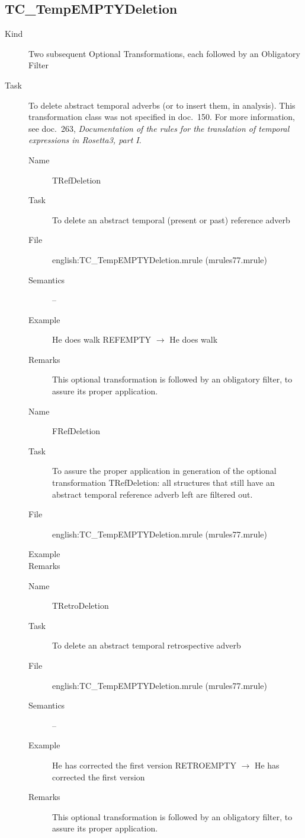 \newpage
\subsection{TC\_TempEMPTYDeletion}
\begin{description}
\item[Kind] Two subsequent Optional Transformations, each followed by an 
Obligatory Filter
\item[Task] To delete abstract temporal adverbs (or to insert them, in 
analysis). This transformation class was 
not specified in doc.\ 150. For more information, see doc.\ 263, {\em 
Documentation of the rules for the translation of temporal expressions in 
Rosetta3, part I\/}.

\vspace{1 cm}
\begin{description}
\item[Name] TRefDeletion
\item[Task] To delete an abstract temporal (present or past) reference adverb 
\item[File] english:TC\_TempEMPTYDeletion.mrule (mrules77.mrule)
\item[Semantics] --
\item[Example] He does walk REFEMPTY $\rightarrow$ He does walk
\item[Remarks] This optional transformation is followed by an obligatory 
filter, to assure its proper application.
\end{description}

\vspace{1 cm}
\begin{description}
\item[Name] FRefDeletion 
\item[Task] To assure the proper application in generation of the optional 
transformation TRefDeletion: all structures that still have an abstract 
temporal reference adverb left are filtered out.
\item[File] english:TC\_TempEMPTYDeletion.mrule (mrules77.mrule)
\item[Example] 
\item[Remarks]
\end{description}

\vspace{1 cm}
\begin{description}
\item[Name] TRetroDeletion
\item[Task] To delete an abstract temporal retrospective adverb 
\item[File] english:TC\_TempEMPTYDeletion.mrule (mrules77.mrule)
\item[Semantics] --
\item[Example] He has corrected the first version RETROEMPTY 
$\rightarrow$ He has corrected the first version
\item[Remarks] This optional transformation is followed by an obligatory 
filter, to assure its proper application.
\end{description}


\end{description}
